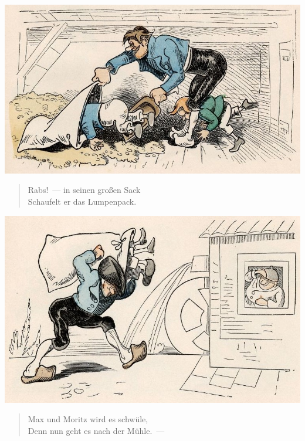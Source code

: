\documentclass[a4paper,12pt]{article}
\begin{document}
\begin{center}\includegraphics[scale=.7, alt={In den Sack}]{images/7-06.jpg}\end{center}



\begin{verse}
Rabs!~— in seinen großen Sack\\{}
Schaufelt er das Lumpenpack.
\end{verse}



\begin{center}\includegraphics[scale=.7, alt={... zur Mühle}]{images/7-07.jpg}\end{center}



\begin{verse}
Max und Moritz wird es schwüle,\\{}
Denn nun geht es nach der Mühle.~—
\end{verse}
\end{document}
